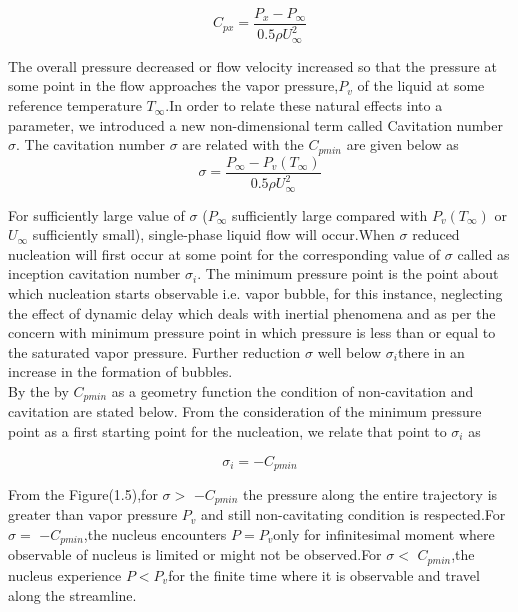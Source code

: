 \begin{equation}
C_{px} =\frac {P_x-P_{\infty}}{{0.5 \rho {U^{2}_{\infty}}}}
\end{equation}

The overall pressure decreased or flow velocity increased so that the
pressure at some point in the flow approaches the vapor pressure,$P_v$
of the liquid at some reference temperature $T_{\infty}$.In order to
relate these natural effects into a parameter, we introduced a new
non-dimensional term called Cavitation number $\sigma$. The cavitation
number $\sigma$ are related with the $C_{pmin}$ are given below as
\begin{equation}
\sigma =\frac{{P_{\infty}}-{{P_v}(T_{\infty})}}{{0.5 \rho {U^{2}_{\infty}}}}
\end{equation}

For sufficiently large value of $\sigma$ ($P_\infty$ sufficiently
large compared with $P_v$$(T_\infty)$ or $U_\infty$ sufficiently
small), single-phase liquid flow will occur.When $\sigma$ reduced
nucleation will first occur at some point for the corresponding value
of $\sigma$ called as inception cavitation number ${\sigma}_i$. The
minimum pressure point is the point about which nucleation starts
observable i.e. vapor bubble, for this instance, neglecting the effect
of dynamic delay which deals with inertial phenomena and as per the
concern with minimum pressure point in which pressure is less than or
equal to the saturated vapor pressure. Further reduction $\sigma$ well
below ${\sigma}_i$there in an increase in the formation of
bubbles. \\ By the by $C_{pmin}$ as a geometry function the condition
of non-cavitation and cavitation are stated below. From the
consideration of the minimum pressure point as a first starting point
for the nucleation, we relate that point to ${\sigma}_i$ as

\begin{equation}
{{\sigma}_i} =-C_{pmin}
\end{equation}

From the Figure(1.5),for $\sigma >$ $-C_{pmin}$ the pressure along the
entire trajectory is greater than vapor pressure $P_v$ and still
non-cavitating condition is respected.For $\sigma =$ $-C_{pmin}$,the
nucleus encounters $P=P_v$only for infinitesimal moment where
observable of nucleus is limited or might not be observed.For $\sigma
<$ $C_{pmin}$,the nucleus experience $P<P_v$for the finite time where
it is observable and travel along the streamline.\\

